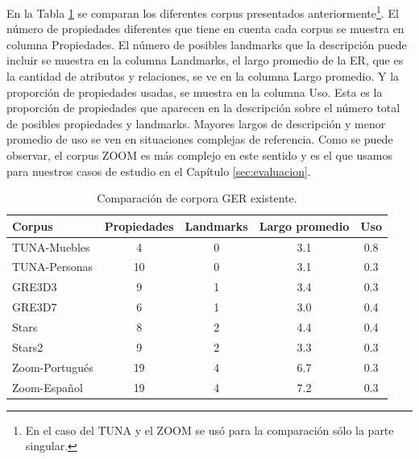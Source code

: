En la Tabla \ref{tab-comparison-prop} se comparan los diferentes corpus presentados anteriormente\footnote{En el caso del TUNA y el ZOOM se us\'o para la comparaci\'on s\'olo la parte singular.}. El n\'umero de propiedades diferentes que tiene en cuenta cada corpus se muestra en columna Propiedades. El n\'umero de posibles landmarks que la descripci\'on puede incluir se muestra en la columna Landmarks, el largo promedio de la ER, que es la cantidad de atributos y relaciones, se ve en la columna Largo promedio. Y la proporci\'on de propiedades usadas, se muestra en la columna Uso. Esta es la proporci\'on de propiedades que aparecen en la descripci\'on sobre el n\'umero total de posibles propiedades y landmarks. Mayores largos de descripci\'on y menor promedio de uso se ven en situaciones complejas de referencia. Como se puede observar, el corpus ZOOM es m\'as complejo en este sentido y es el que usamos para nuestros casos de estudio en el Cap\'itulo \ref{sec:evaluacion}.

\begin{table}[ht]
\begin{center}
\footnotesize{

\begin{tabular} {  l c c c c}
\hline
Corpus											&Propiedades			  & Landmarks			& Largo promedio	& Uso \\
\hline
TUNA-Muebles							  & 4								& 0							&	3.1				& 0.8   \\
TUNA-Personas								& 10							& 0							& 3.1				& 0.3   \\
GRE3D3											&	9								& 1							& 3.4				& 0.3   \\
GRE3D7											&	6								& 1							& 3.0				& 0.4   \\
Stars												&	8								& 2							& 4.4				& 0.4   \\
Stars2											& 9								& 2							& 3.3				& 0.3   \\
Zoom-Portugu\'es						& 19							& 4							& 6.7				& 0.3   \\
Zoom-Espa\~nol							& 19							& 4							& 7.2				& 0.3   \\
\hline
\end{tabular}
}
\end{center}
\caption{Comparaci\'on de corpora GER existente.}\label{tab-comparison-prop}
\end{table}

